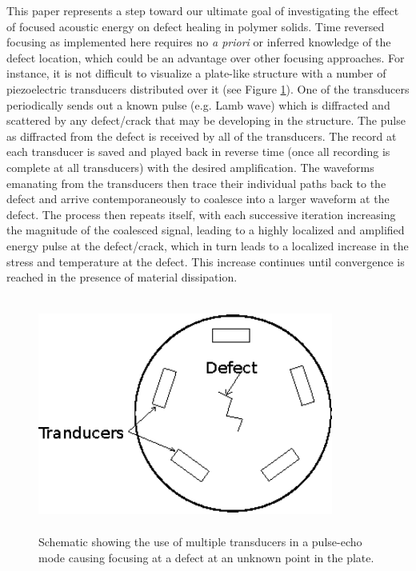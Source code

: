 \documentclass[11pt,letterpaper]{article}%
\begin{document}
This paper represents a step toward our ultimate goal of
investigating the effect of focused acoustic energy on defect
healing in polymer solids.  Time reversed focusing as implemented
here requires no {\em a priori} or inferred knowledge of the
defect location, which could be an advantage over other focusing
approaches.  For instance, it is not difficult to visualize a
plate-like structure with a number of piezoelectric transducers
distributed over it (see Figure \ref{explain}).  One of the
transducers periodically sends out a known pulse (e.g. Lamb wave)
which is diffracted and scattered by any defect/crack that may be
developing in the structure.  The pulse as diffracted from the
defect is received by all of the transducers.  The record at each
transducer is saved and played back in reverse time (once all
recording is complete at all transducers) with the desired
amplification.  The waveforms emanating from the transducers then
trace their individual paths back to the defect and arrive
contemporaneously to coalesce into a larger waveform at the
defect.  The process then repeats itself, with each successive
iteration increasing the magnitude of the coalesced signal,
leading to a highly localized and amplified energy pulse at the
defect/crack, which in turn leads to a localized increase in the
stress and temperature at the defect. This increase continues
until convergence is reached in the presence of material
dissipation.
\begin{figure}
\begin{center}
\includegraphics[width=9.7cm,height=7.75cm]{tr.eps}
\end{center}
 \caption[des1]
   { \label{explain}
Schematic showing the use of multiple transducers in a pulse-echo
mode causing focusing at a defect at an unknown point in the
plate.
 }
 \end{figure}
\end{document}
